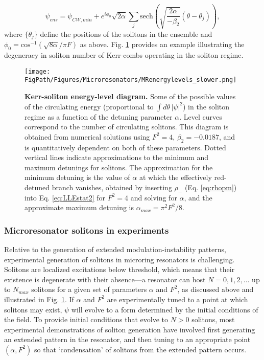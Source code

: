 \begin{equation}
\psi_{ens}=\psi_{CW,min}+e^{i\phi_0}\sqrt{2\alpha}\sum_j \mathrm{sech}\left(\sqrt{\frac{2\alpha}{-\beta_2}}(\theta-\theta_j)\right),\label{eq:LLEsolens}
\end{equation}
where $\{\theta_j\}$ define the positions of the solitons in the ensemble and $\phi_0=\mathrm{cos}^{-1}(\sqrt{8\alpha}/\pi F)$ as above. Fig. \ref{fig:MRenergylevels} provides an example illustrating the degeneracy in soliton number of Kerr-combs operating in the soliton regime.

\begin{figure}[htpb]
	\begin{center}
		\texttt{[image: \\FigPath/Figures/Microresonators/MRenergylevels\_slower.png]}
	\end{center}
	\caption[Kerr-soliton energy-level diagram]{\textbf{Kerr-soliton energy-level diagram.} Some of the possible values of the circulating energy (proportional to $\int d\theta\,|\psi|^2$) in the soliton regime as a function of the detuning parameter $\alpha$. Level curves correspond to the number of circulating solitons. This diagram is obtained from numerical solutions using $F^2=4$, $\beta_2=-0.0187$, and is quantitatively dependent on both of these parameters. Dotted vertical lines indicate approximations to the minimum and maximum detunings for solitons. The approximation for the minimum detuning is the value of $\alpha$ at which the effectively red-detuned branch vanishes, obtained by inserting $\rho_-$ (Eq. \ref{eq:rhopm}) into Eq. \ref{eq:LLEstat2} for $F^2=4$ and solving for $\alpha$, and the approximate maximum detuning is $\alpha_{max}=\pi^2 F^2/8$.}
	
	\label{fig:MRenergylevels}
\end{figure} 





\subsubsection{Microresonator solitons in experiments}


Relative to the generation of extended modulation-instability patterns, experimental generation of solitons in microring resonators is challenging. Solitons are localized excitations below threshold, which means that their existence is degenerate with their absence---a resonator can host $N=0, 1, 2,...$ up to $N_{max}$ solitons for a given set of parameters $\alpha$ and $F^2$, as discussed above and illustrated in Fig. \ref{fig:MRenergylevels}. If $\alpha$ and $F^2$ are experimentally tuned to a point at which solitons may exist, $\psi$ will evolve to a form determined by the initial conditions of the field. To provide initial conditions that evolve to $N>0$ solitons, most experimental demonstrations of soliton generation have involved first generating an extended pattern in the resonator, and then tuning to an appropriate point $(\alpha,F^2)$ so that `condensation' of solitons from the extended pattern occurs. 

